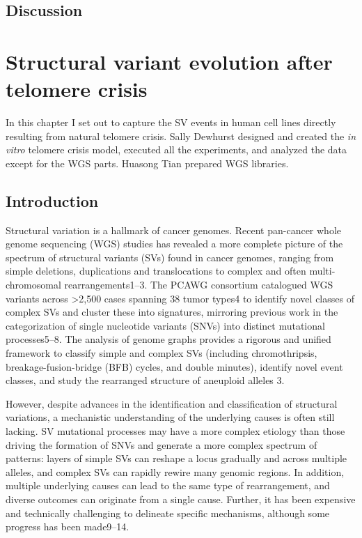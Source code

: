\documentclass[phd,tocprelim]{cornell}
\begin{document}
\section{Discussion}


\chapter{Structural variant evolution after telomere crisis} \label{chap:4}
In this chapter I set out to capture the SV events in human cell lines directly resulting from natural telomere crisis. Sally Dewhurst designed and created the \textit{in vitro} telomere crisis model, executed all the experiments, and analyzed the data except for the WGS parts. Huasong Tian prepared WGS libraries.

\section{Introduction}
Structural variation is a hallmark of cancer genomes. Recent pan-cancer whole genome sequencing (WGS) studies has revealed a more complete picture of the spectrum of structural variants (SVs) found in cancer genomes, ranging from simple deletions, duplications and translocations to complex and often multi-chromosomal rearrangements1–3. The PCAWG consortium catalogued WGS variants across >2,500 cases spanning 38 tumor types4 to identify novel classes of complex SVs and cluster these into signatures, mirroring previous work in the categorization of single nucleotide variants (SNVs) into distinct mutational processes5–8. The analysis of genome graphs provides a rigorous and unified framework to classify simple and complex SVs (including chromothripsis, breakage-fusion-bridge (BFB) cycles, and double minutes), identify novel event classes, and study the rearranged structure of aneuploid alleles 3.

However, despite advances in the identification and classification of structural variations, a mechanistic understanding of the underlying causes is often still lacking. SV mutational processes may have a more complex etiology than those driving the formation of SNVs and generate a more complex spectrum of patterns: layers of simple SVs can reshape a locus gradually and across multiple alleles, and complex SVs can rapidly rewire many genomic regions. In addition, multiple underlying causes can lead to the same type of rearrangement, and diverse outcomes can originate from a single cause. Further, it has been expensive and technically challenging to delineate specific mechanisms, although some progress has been made9–14.
\end{document}
